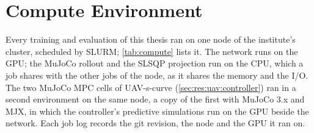 \FloatBarrier



\chapter{Compute Environment}\label{app:repro}\label{app:compute}

Every training and evaluation of this thesis ran on one node of the institute's cluster, scheduled by
SLURM; \autoref{tab:compute} lists it. The network runs on the GPU; the MuJoCo rollout and the SLSQP
projection run on the CPU, which a job shares with the other jobs of the node, as it shares the memory
and the I/O. The two MuJoCo MPC cells of UAV-s-curve (\autoref{sec:res:uav:controller}) ran in a
second environment on the same node, a copy of the first with MuJoCo 3.x and MJX, in which the
controller's predictive simulations run on the GPU beside the network. Each job log records the git
revision, the node and the GPU it ran on.


